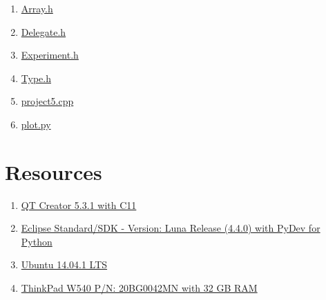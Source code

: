 \documentclass[11pt,english,a4paper]{article}
\begin{document}
\begin{flushleft}
\begin{enumerate}
\item{\href{https://github.com/Eimund/UiO/blob/master/FYS4150/Project\%205/project5/Array.h}{Array.h}}
\item{\href{https://github.com/Eimund/UiO/blob/master/FYS4150/Project\%205/project5/Delegate.h}{Delegate.h}}
\item{\href{https://github.com/Eimund/UiO/blob/master/FYS4150/Project\%205/project5/Experiment.h}{Experiment.h}}
\item{\href{https://github.com/Eimund/UiO/blob/master/FYS4150/Project\%205/project5/Type.h}{Type.h}}
\item{\href{https://github.com/Eimund/UiO/blob/master/FYS4150/Project\%205/project5/project5.cpp}{project5.cpp}}
\item{\href{https://github.com/Eimund/UiO/blob/master/FYS4150/Project\%205/plot.py}{plot.py}}
\end{enumerate}


\section{Resources}

\begin{enumerate}
\item{\href{http://qt-project.org/downloads}{QT Creator 5.3.1 with C11}}
\item{\href{https://www.eclipse.org/downloads/}{Eclipse Standard/SDK  - Version: Luna Release (4.4.0) with PyDev for Python}}
\item{\href{http://www.ubuntu.com/download/desktop}{Ubuntu 14.04.1 LTS}}
\item{\href{http://shop.lenovo.com/no/en/laptops/thinkpad/w-series/w540/#tab-reseller}{ThinkPad W540 P/N: 20BG0042MN with 32 GB RAM}}
\end{enumerate}


\end{flushleft}
\end{document}
